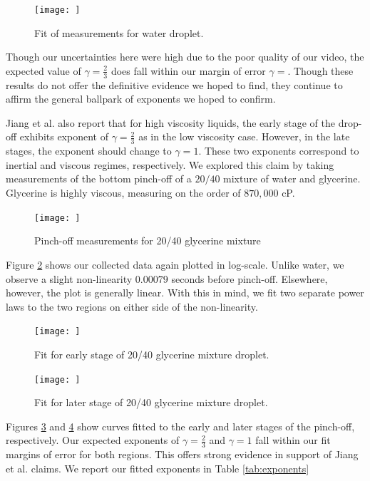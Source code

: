 \documentclass[12pt, letterpaper]{article}
\begin{document}
\begin{figure}[!h]
    \centering
    \texttt{[image: ]}
    \caption{Fit of measurements for water droplet.}
    \label{fig:water-fit2}
\end{figure}

Though our uncertainties here were high due to the poor quality of our video, the expected value of $\gamma = \frac{2}{3}$ does fall within our margin of error $\gamma = $. Though these results do not offer the definitive evidence we hoped to find, they continue to affirm the general ballpark of exponents we hoped to confirm. 

Jiang et al. also report that for high viscosity liquids, the early stage of the drop-off exhibits exponent of $\gamma = \frac{2}{3}$ as in the low viscosity case. However, in the late stages, the exponent should change to $\gamma = 1$. These two exponents correspond to inertial and viscous regimes, respectively. We explored this claim by taking measurements of the bottom pinch-off of a $20/40$ mixture of water and glycerine. Glycerine is highly viscous, measuring on the order of $870,000$ cP. 

\begin{figure}[!h]
    \centering
    \texttt{[image: ]}
    \caption{Pinch-off measurements for 20/40 glycerine mixture}
    \label{fig:glycerine}
\end{figure}

Figure \ref{fig:glycerine} shows our collected data again plotted in log-scale. Unlike water, we observe a slight non-linearity $0.00079$ seconds before pinch-off. Elsewhere, however, the plot is generally linear. With this in mind, we fit two separate power laws to the two regions on either side of the non-linearity. 

\begin{figure}[!h]
    \centering
    \texttt{[image: ]}
    \caption{Fit for early stage of 20/40 glycerine mixture droplet.}
    \label{fig:glycerine-fit1}
\end{figure}

\begin{figure}[!h]
    \centering
    \texttt{[image: ]}
    \caption{Fit for later stage of 20/40 glycerine mixture droplet.}
    \label{fig:glycerine-fit2}
\end{figure}

Figures \ref{fig:glycerine-fit1} and \ref{fig:glycerine-fit2} show curves fitted to the early and later stages of the pinch-off, respectively. Our expected exponents of $\gamma = \frac{2}{3}$ and $\gamma = 1$ fall within our fit margins of error for both regions. This offers strong evidence in support of Jiang et al. claims. We report our fitted exponents in Table \ref{tab:exponents}
\end{document}
